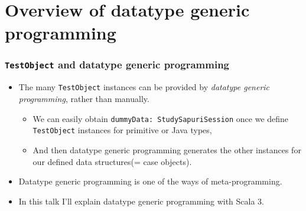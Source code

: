 \section{Overview of datatype generic programming}

\begin{frame}
  \frametitle{\lstinline|TestObject| and datatype generic programming}

  \pause
  \begin{itemize}
    \item<+-> The many \lstinline|TestObject| instances can be provided by
    \emph{datatype generic programming}, rather than manually.
    \begin{itemize}
      \item We can easily obtain \lstinline|dummyData: StudySapuriSession| once we define
      \lstinline|TestObject| instances for primitive or Java types,
      \item And then datatype generic programming generates the other instances for our
      defined data structures(= case objects).
    \end{itemize}

    \item<+-> Datatype generic programming is one of the ways of meta-programming.

    \item<+-> In this talk I'll explain datatype generic programming with Scala 3.
  \end{itemize}

\end{frame}

